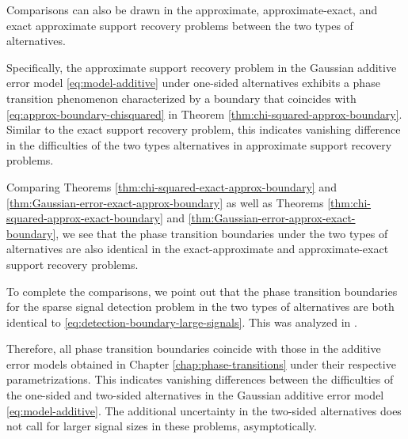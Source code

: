 Comparisons can also be drawn in the approximate, approximate-exact, and exact approximate support recovery problems between the two types of alternatives.

Specifically, the approximate support recovery problem in the Gaussian additive error model \eqref{eq:model-additive} under one-sided alternatives exhibits a phase transition phenomenon characterized by a boundary that coincides with \eqref{eq:approx-boundary-chisquared} in Theorem \ref{thm:chi-squared-approx-boundary}.
Similar to the exact support recovery problem, this indicates vanishing difference in the difficulties of the two types alternatives in approximate support recovery problems.

Comparing Theorems \ref{thm:chi-squared-exact-approx-boundary} and \ref{thm:Gaussian-error-exact-approx-boundary} as well as
 Theorems \ref{thm:chi-squared-approx-exact-boundary} and \ref{thm:Gaussian-error-approx-exact-boundary}, we see that the phase transition boundaries under the two types of alternatives are also identical in the exact-approximate and approximate-exact support recovery problems.

To complete the comparisons, we point out that the phase transition boundaries for the sparse signal {detection} problem in the two types of alternatives are both identical to \eqref{eq:detection-boundary-large-signals}. This was analyzed in \cite{donoho2004higher}.

Therefore, all phase transition boundaries coincide with those in the additive error models obtained in Chapter \ref{chap:phase-transitions} under their respective parametrizations.
This indicates vanishing differences between the difficulties of the one-sided and two-sided alternatives in the Gaussian additive error model 
\eqref{eq:model-additive}. The additional uncertainty in the two-sided alternatives does not call for larger signal sizes in these problems, asymptotically.



